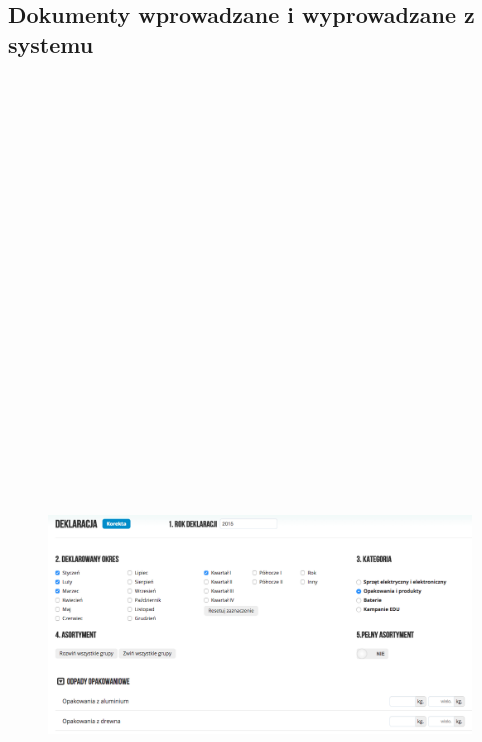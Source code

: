 \documentclass[paper=a4, fontsize=12pt]{scrartcl}
\numberwithin{equation}{section}		%
\numberwithin{figure}{section}			%
\numberwithin{table}{section}				%
\begin{document}
	\subsection{Dokumenty wprowadzane i wyprowadzane z systemu}
		
		\begin{figure}[H]
			\centering
			\vspace{-2cm}
			\centerline{\includegraphics[angle=90, height=29cm]{partials/2-wymagania/dokumenty/formularz.png}}
		\end{figure}
		
\end{document}
